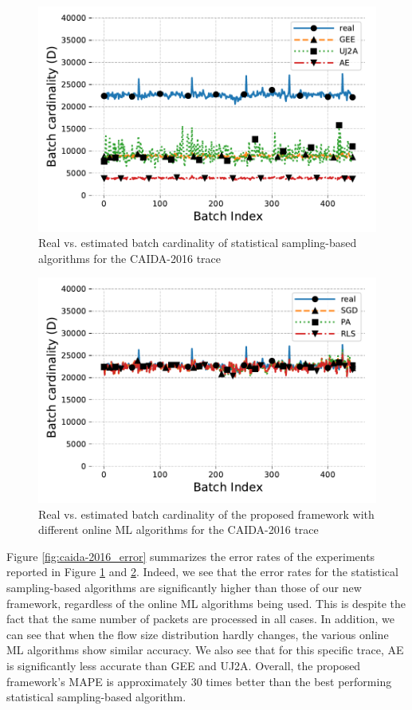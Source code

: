 		\begin{figure}[!tb]
			\centering
			\includegraphics[width=.99\linewidth]{img/caida-2016_sampling_paper.pdf}
			\caption{Real vs. estimated batch cardinality of statistical sampling-based algorithms for the CAIDA-2016 trace}
			\label{fig:caida-2016_statistical}
		\end{figure}
		
		\begin{figure}[!tb]
			\centering
			\includegraphics[width=.99\linewidth]{img/caida-2016_online_ml_paper.pdf}
			\caption{Real vs. estimated batch cardinality of the proposed framework with different online ML algorithms for the CAIDA-2016 trace}
			\label{fig:caida-2016_online_ml}
		\end{figure}


		Figure \ref{fig:caida-2016_error} summarizes the error rates of the experiments reported in Figure \ref{fig:caida-2016_statistical} and \ref{fig:caida-2016_online_ml}. Indeed, we see that the error rates for the statistical sampling-based algorithms are significantly higher than those of our new framework, regardless of the online ML algorithms being used. This is despite the fact that the same number of packets are processed in all cases. In addition, we can see that when the flow size distribution hardly changes, the various online ML algorithms show similar accuracy. We also see that for this specific trace, AE is significantly less accurate than GEE and UJ2A. Overall, the proposed framework's MAPE is approximately 30 times better than the best performing statistical sampling-based algorithm.

